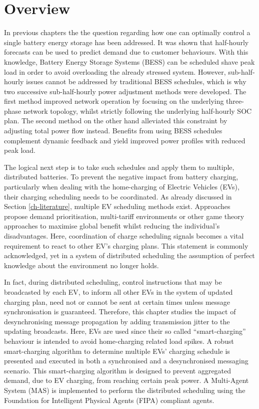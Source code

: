 \section{Overview}
\label{ch3:sec:overview}

In previous chapters the the question regarding how one can optimally control a single battery energy storage has been addressed.
It was shown that half-hourly forecasts can be used to predict demand due to customer behaviours.
With this knowledge, Battery Energy Storage Systems (BESS) can be scheduled shave peak load in order to avoid overloading the already stressed system.
However, sub-half-hourly issues cannot be addressed by traditional BESS schedules, which is why two successive sub-half-hourly power adjustment methods were developed.
The first method improved network operation by focusing on the underlying three-phase network topology, whilst strictly following the underlying half-hourly SOC plan.
The second method on the other hand alleviated this constraint by adjusting total power flow instead.
Benefits from using BESS schedules complement dynamic feedback and yield improved power profiles with reduced peak load.

The logical next step is to take such schedules and apply them to multiple, distributed batteries.
To prevent the negative impact from battery charging, particularly when dealing with the home-charging of Electric Vehicles (EVs), their charging scheduling needs to be coordinated.
As already discussed in Section \ref{ch-literature}, multiple EV scheduling methods exist.
Approaches propose demand prioritisation, multi-tariff environments or other game theory approaches to maximise global benefit whilst reducing the individual's disadvantages.
Here, coordination of charge scheduling signals becomes a vital requirement to react to other EV's charging plans.
This statement is commonly acknowledged, yet in a system of distributed scheduling the assumption of perfect knowledge about the environment no longer holds.

In fact, during distributed scheduling, control instructions that may be broadcasted by each EV, to inform all other EVs in the system of updated charging plan, need not or cannot be sent at certain times unless message synchronisation is guaranteed.
Therefore, this chapter studies the impact of desynchronising message propagation by adding transmission jitter to the updating broadcasts.
Here, EVs are used since their so called ``smart-charging'' behaviour is intended to avoid home-charging related load spikes.
A robust smart-charging algorithm to determine multiple EVs' charging schedule is presented and executed in both a synchronised and a desynchronised messaging scenario.
This smart-charging algorithm is designed to prevent aggregated demand, due to EV charging, from reaching certain peak power.
A Multi-Agent System (MAS) is implemented to perform the distributed scheduling using the Foundation for Intelligent Physical Agents (FIPA) compliant agents.


